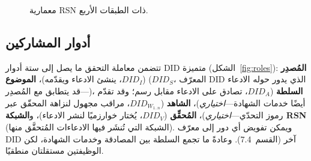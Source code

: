 \documentclass[11pt,a4paper,twocolumn]{article}
\begin{document}
\begin{figure}[ht]
\centering
{}
\caption{معمارية RSN ذات الطبقات الأربع.}
\label{fig:architecture}
\end{figure}

\subsection{أدوار المشاركين}

تتضمن معاملة التحقق ما يصل إلى ستة أدوار DID متميزة (الشكل~\ref{fig:roles}): \textbf{المُصدِر} ($DID_I$، ينشئ الادعاء ويقدّمه)، \textbf{الموضوع} ($DID_S$، المعرّف DID الذي يدور حوله الادعاء---قد يتطابق مع المُصدِر)، \textbf{السلطة} ($DID_A$، تصادق على الادعاء مقابل رسم؛ وقد تقدّم أيضًا خدمات الشهادة---\emph{اختياري})، \textbf{الشاهد} ($DID_{W_{1..n}}$، مراقب مجهول لنزاهة المحقّق عبر رموز التحدّي---\emph{اختياري})، \textbf{المُحقِّق} ($DID_V$، يُختار خوارزميًا لنشر الادعاء)، و\textbf{الشبكة RSN} (الشبكة التي تُنشَر فيها الادعاءات المُتحقَّق منها). ويمكن تفويض أي دور إلى معرّف DID آخر (القسم~7.4). وعادةً ما تجمع السلطة بين المصادقة وخدمات الشهادة، لكن الوظيفتين مستقلتان منطقيًا.
\end{document}
